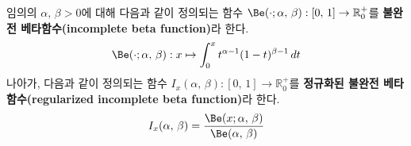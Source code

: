 \begin{definition}
    임의의 $\alpha,\,\beta>0$에 대해 다음과 같이 정의되는 함수 $\Be(\cdot;\alpha,\,\beta):[0,\,1]\to\mathbb{R}^+_0$를 \textbf{불완전 베타함수(incomplete beta function)}라 한다.
    \begin{equation*}
        \Be(\cdot;\alpha,\,\beta):x\mapsto\int_0^xt^{\alpha-1}(1-t)^{\beta-1}\,dt
    \end{equation*}
    나아가, 다음과 같이 정의되는 함수 $I_x(\alpha,\,\beta):[0,\,1]\to\mathbb{R}^+_0$를 \textbf{정규화된 불완전 베타함수(regularized incomplete beta function)}라 한다.
    \begin{equation*}
        I_x(\alpha,\,\beta)=\frac{\Be(x;\alpha,\,\beta)}{\Be(\alpha,\,\beta)}
    \end{equation*}
\end{definition}


